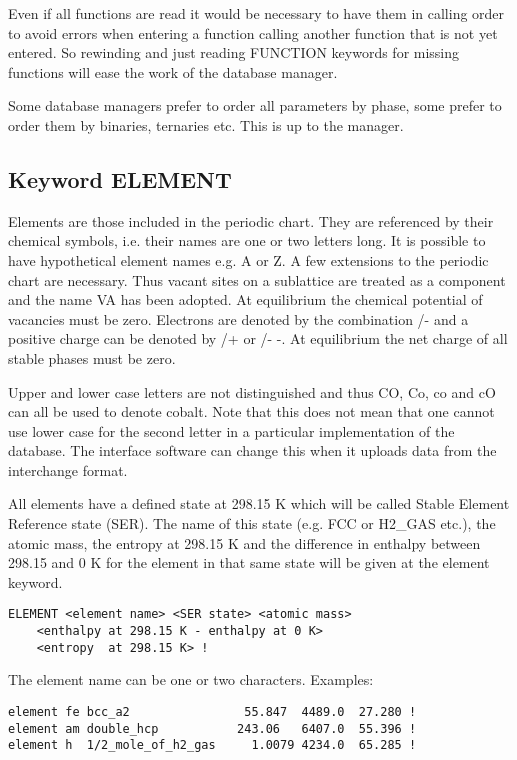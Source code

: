 \documentclass[12pt]{article}
\begin{document}
Even if all functions are read it would be necessary to have them in
calling order to avoid errors when entering a function calling another
function that is not yet entered.  So rewinding and just reading
FUNCTION keywords for missing functions will ease the work of the
database manager.

Some database managers prefer to order all parameters by phase, some
prefer to order them by binaries, ternaries etc.  This is up to the
manager.

\subsection{Keyword ELEMENT}

Elements are those included in the periodic chart.  They are
referenced by their chemical symbols, i.e.  their names are one or two
letters long.  It is possible to have hypothetical element names e.g.
A or Z.  A few extensions to the periodic chart are necessary.  Thus
vacant sites on a sublattice are treated as a component and the name
VA has been adopted.  At equilibrium the chemical potential of
vacancies must be zero.  Electrons are denoted by the combination /- and
a positive charge can be denoted by /+ or /- -.  At equilibrium the net charge of
all stable phases must be zero.

Upper and lower case letters are not distinguished and thus CO, Co, co
and cO can all be used to denote cobalt.  Note that this does not mean
that one cannot use lower case for the second letter in a particular
implementation of the database.  The interface software can change
this when it uploads data from the interchange format.

All elements have a defined state at 298.15 K which will be called
Stable Element Reference state (SER).  The name of this state (e.g.  FCC
or H2\_GAS etc.), the atomic mass, the entropy at 298.15 K and the
difference in enthalpy between 298.15 and 0 K for the element in that
same state will be given at the element keyword.

\begin{verbatim}
ELEMENT <element name> <SER state> <atomic mass>
    <enthalpy at 298.15 K - enthalpy at 0 K>
    <entropy  at 298.15 K> !
\end{verbatim}

The element name can be one or two characters.  Examples:

\begin{verbatim}
element fe bcc_a2                55.847  4489.0  27.280 !
element am double_hcp           243.06   6407.0  55.396 !
element h  1/2_mole_of_h2_gas     1.0079 4234.0  65.285 !
\end{verbatim}
\end{document}

